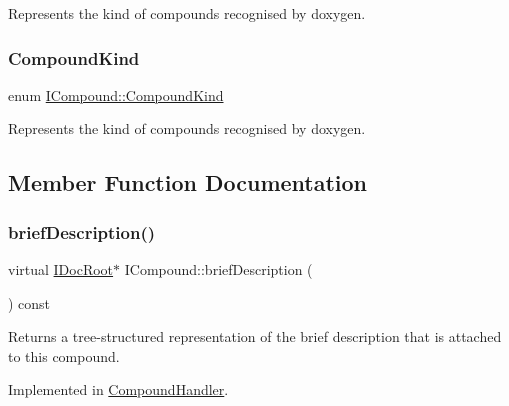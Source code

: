 Represents the kind of compounds recognised by doxygen. \mbox{\label{class_i_compound_a6b86be2ca9f6759434c1dd8405be328a}} 
\subsubsection{\texorpdfstring{CompoundKind}{CompoundKind}\hspace{0.1cm}{\footnotesize\ttfamily [2/2]}}
{\footnotesize\ttfamily enum \mbox{\hyperlink{class_i_compound_a6b86be2ca9f6759434c1dd8405be328a}{I\+Compound\+::\+Compound\+Kind}}}

Represents the kind of compounds recognised by doxygen. 

\subsection{Member Function Documentation}
\mbox{\label{class_i_compound_a1ac3073130ef6bdd552c275e488c0658}} 
\subsubsection{\texorpdfstring{briefDescription()}{briefDescription()}\hspace{0.1cm}{\footnotesize\ttfamily [1/2]}}
{\footnotesize\ttfamily virtual \mbox{\hyperlink{class_i_doc_root}{I\+Doc\+Root}}$\ast$ I\+Compound\+::brief\+Description (\begin{DoxyParamCaption}{ }\end{DoxyParamCaption}) const\hspace{0.3cm}{\ttfamily [pure virtual]}}

Returns a tree-\/structured representation of the brief description that is attached to this compound. 

Implemented in \mbox{\hyperlink{class_compound_handler_a082a2132828d9949c5889a7d5a225b01}{Compound\+Handler}}.

\mbox{\label{class_i_compound_a1ac3073130ef6bdd552c275e488c0658}} 
